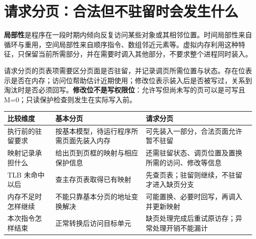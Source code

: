 \section{请求分页：合法但不驻留时会发生什么}\label{OS03-5-7}

\textbf{局部性}是程序在一段时期内倾向反复访问某些对象或其相邻位置。时间局部性来自循环与重用，空间局部性来自顺序指令、数组邻近元素等。虚拟内存利用这种特征，只保留当前所需部分，并在需要时调入其他部分，不要求整个进程同时装入。

请求分页的页表项需要区分页面是否驻留，并记录调页所需位置与状态。存在位表示是否在内存；访问位帮助估计近期使用；修改位表示装入后是否被写过，关系到淘汰时是否必须回写。\textbf{修改位不是写权限位}：允许写但尚未写的页可以是可写且 M=0；只读保护检查则发生在实际写入前。

\begin{wideblock}

\par\medskip\noindent\begin{minipage}{\linewidth}\fontsize{9.3}{12}\selectfont\begin{tabularx}{\linewidth}{@{}YYY@{}}
\toprule\noalign{}
\begin{minipage}[b]{\linewidth}\raggedright
比较维度
\end{minipage} & \begin{minipage}[b]{\linewidth}\raggedright
基本分页
\end{minipage} & \begin{minipage}[b]{\linewidth}\raggedright
请求分页
\end{minipage} \\
\midrule\noalign{}


执行前的驻留要求 & 按基本模型，待运行程序所需页面先装入内存 & 可先装入一部分，合法页面允许暂不驻留 \\
映射记录承担什么 & 给出页到页框的映射与相应保护信息 & 还需驻留状态、调页位置及置换所需的访问、修改等信息 \\
TLB 未命中以后 & 查主存页表取得已有映射 & 先查页表；驻留则继续，不驻留才进入缺页分支 \\
内存不足时怎样继续 & 不能只靠基本分页的地址变换解决 & 可能置换、必要时回写，再调入并更新映射 \\
本次指令怎样结束 & 正常转换后访问目标单元 & 缺页处理完成后重试原访存；异常处理开销不能漏计 \\
\bottomrule\end{tabularx}
\end{minipage}\par\medskip

\end{wideblock}

